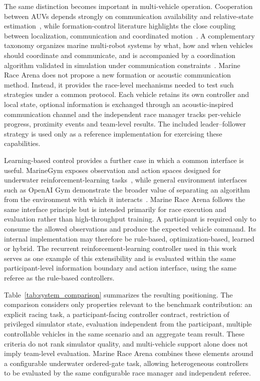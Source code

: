 The same distinction becomes important in multi-vehicle operation. Cooperation
between AUVs depends strongly on communication availability and relative-state
estimation~\cite{yang2021survey}, while formation-control literature highlights
the close coupling between localization, communication and coordinated
motion~\cite{yan2023formation}. A complementary taxonomy organizes marine
multi-robot systems by what, how and when vehicles should coordinate and
communicate, and is accompanied by a coordination algorithm validated in
simulation under communication
constraints~\cite{martorell2024marinecoordination}. Marine Race Arena does not
propose a new formation or acoustic communication method. Instead, it provides
the race-level mechanisms needed to test such strategies under a common
protocol. Each vehicle retains its own controller and local state, optional
information is exchanged through an acoustic-inspired communication channel and
the independent race manager tracks per-vehicle progress, proximity events and
team-level results. The included leader--follower strategy is used only as a
reference implementation for exercising these capabilities.

Learning-based control provides a further case in which a common interface is
useful. MarineGym exposes observation and action spaces designed for underwater
reinforcement-learning tasks~\cite{chu2025marinegym}, while general environment
interfaces such as OpenAI Gym demonstrate the broader value of separating an
algorithm from the environment with which it
interacts~\cite{brockman2016openaigym}. Marine Race Arena follows the same
interface principle but is intended primarily for race execution and evaluation
rather than high-throughput training. A participant is required only to consume
the allowed observations and produce the expected vehicle command. Its internal
implementation may therefore be rule-based, optimization-based, learned or
hybrid. The recurrent reinforcement-learning controller used in this work serves
as one example of this extensibility and is evaluated within the same
participant-level information boundary and action interface, using the same
referee as the rule-based controllers.

Table~\ref{tab:system_comparison} summarizes the resulting positioning. The
comparison considers only properties relevant to the benchmark contribution:
an explicit racing task, a participant-facing controller contract, restriction
of privileged simulator state, evaluation independent from the participant,
multiple controllable vehicles in the same scenario and an aggregate team
result. These criteria do not rank simulator quality, and multi-vehicle support
alone does not imply team-level evaluation. Marine Race Arena combines these
elements around a configurable underwater ordered-gate task, allowing
heterogeneous controllers to be evaluated by the same configurable race manager
and independent referee.


